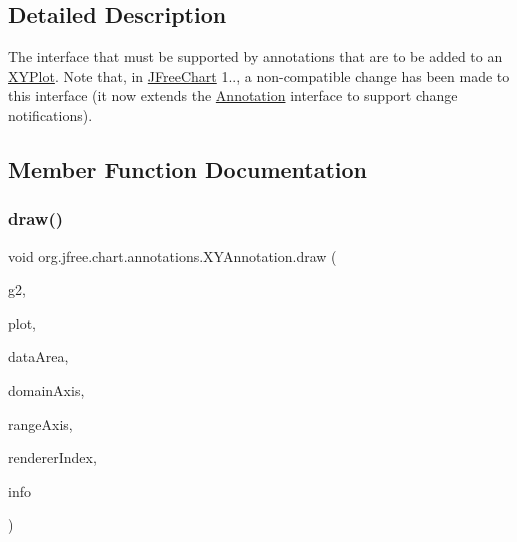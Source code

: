 \subsection{Detailed Description}
The interface that must be supported by annotations that are to be added to an \mbox{\hyperlink{}{X\+Y\+Plot}}. Note that, in \mbox{\hyperlink{classorg_1_1jfree_1_1chart_1_1_j_free_chart}{J\+Free\+Chart}} 1.., a non-\/compatible change has been made to this interface (it now extends the \mbox{\hyperlink{interfaceorg_1_1jfree_1_1chart_1_1annotations_1_1_annotation}{Annotation}} interface to support change notifications). 

\subsection{Member Function Documentation}
\mbox{\label{interfaceorg_1_1jfree_1_1chart_1_1annotations_1_1_x_y_annotation_ada5edc52b7dfbaa9ded956afe447b543}} 
\subsubsection{\texorpdfstring{draw()}{draw()}}
{\footnotesize\ttfamily void org.\+jfree.\+chart.\+annotations.\+X\+Y\+Annotation.\+draw (\begin{DoxyParamCaption}\item[{Graphics2D}]{g2,  }\item[{\mbox{\hyperlink{classorg_1_1jfree_1_1chart_1_1plot_1_1_x_y_plot}{X\+Y\+Plot}}}]{plot,  }\item[{Rectangle2D}]{data\+Area,  }\item[{\mbox{\hyperlink{classorg_1_1jfree_1_1chart_1_1axis_1_1_value_axis}{Value\+Axis}}}]{domain\+Axis,  }\item[{\mbox{\hyperlink{classorg_1_1jfree_1_1chart_1_1axis_1_1_value_axis}{Value\+Axis}}}]{range\+Axis,  }\item[{int}]{renderer\+Index,  }\item[{\mbox{\hyperlink{classorg_1_1jfree_1_1chart_1_1plot_1_1_plot_rendering_info}{Plot\+Rendering\+Info}}}]{info }\end{DoxyParamCaption})}

